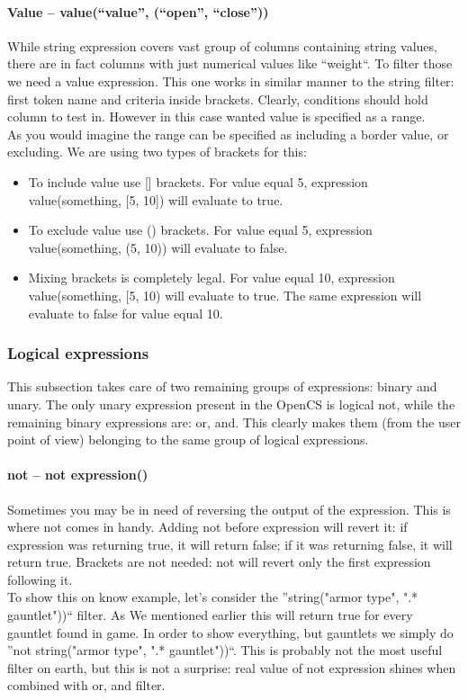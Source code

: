 \paragraph{Value -- value(``value'', (``open'', ``close''))}
While string expression covers vast group of columns containing string values, there are in fact columns with just numerical values like ``weight``. To filter those we need a value expression. This one works in similar manner to the string filter: first token name and criteria inside brackets. Clearly, conditions should hold column to test in. However in this case wanted value is specified as a range.\\
As you would imagine the range can be specified as including a border value, or excluding. We are using two types of brackets for this:
\begin{itemize}
 \item To include value use [] brackets. For value equal 5, expression value(something, [5, 10]) will evaluate to true.
 \item To exclude value use () brackets. For value equal 5, expression value(something, (5, 10)) will evaluate to false.
 \item Mixing brackets is completely legal. For value equal 10, expression value(something, [5, 10) will evaluate to true. The same expression will evaluate to false for value equal 10.
\end{itemize}

\subsubsection{Logical expressions}
This subsection takes care of two remaining groups of expressions: binary and unary. The only unary expression present in the OpenCS is logical not, while the remaining binary expressions are: or, and. This clearly makes them (from the user point of view) belonging to the same group of logical expressions.

\paragraph{not -- not expression()}
Sometimes you may be in need of reversing the output of the expression. This is where not comes in handy. Adding not before expression will revert it: if expression was returning true, it will return false; if it was returning false, it will return true. Brackets are not needed: not will revert only the first expression following it.\\
To show this on know example, let's consider the ''string("armor type", ".* gauntlet"))`` filter. As We mentioned earlier this will return true for every gauntlet found in game. In order to show everything, but gauntlets we simply do ''not string("armor type", ".* gauntlet"))``. This is probably not the most useful filter on earth, but this is not a surprise: real value of not expression shines when combined with or, and filter.

